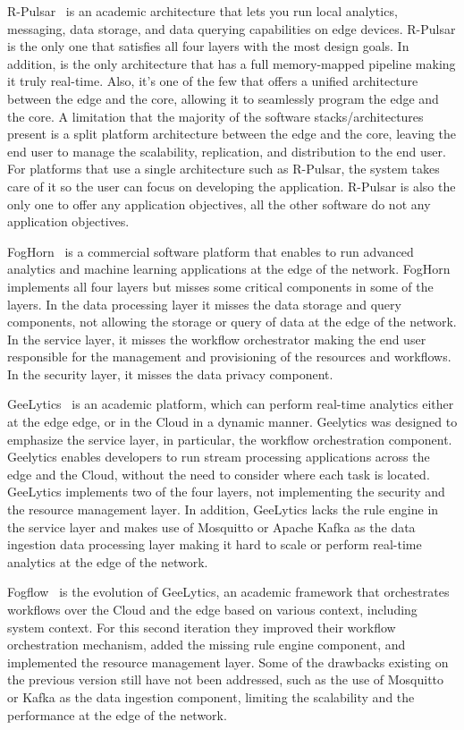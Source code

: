 R-Pulsar~\cite{8014357,8109157} is an academic architecture that lets you run local analytics, messaging, data storage, and data querying capabilities on edge devices. R-Pulsar is the only one that satisfies all four layers with the most design goals. In addition, is the only architecture that has a full memory-mapped pipeline making it truly real-time. Also, it's one of the few that offers a unified architecture between the edge and the core, allowing it to seamlessly program the edge and the core. A limitation that the majority of the software stacks/architectures present is a split platform architecture between the edge and the core, leaving the end user to manage the scalability, replication, and distribution to the end user. For platforms that use a single architecture such as R-Pulsar, the system takes care of it so the user can focus on developing the application. R-Pulsar is also the only one to offer any application objectives, all the other software do not any application objectives.

FogHorn~\cite{fogHorn} is a commercial software platform that enables to run advanced analytics and machine learning applications at the edge of the network. FogHorn implements all four layers but misses some critical components in some of the layers. In the data processing layer it misses the data storage and query components, not allowing the storage or query of data at the edge of the network. In the service layer, it misses the workflow orchestrator making the end user responsible for the management and provisioning of the resources and workflows. In the security layer, it misses the data privacy component.

GeeLytics~\cite{7389116} is an academic platform, which can perform real-time analytics either at the edge edge, or in the Cloud in a dynamic manner. Geelytics was designed to emphasize the service layer, in particular, the workflow orchestration component. Geelytics enables developers to run stream processing applications across the edge and the Cloud, without the need to consider where each task is located. GeeLytics implements two of the four layers, not implementing the security and the resource management layer. In addition, GeeLytics lacks the rule engine in the service layer and makes use of Mosquitto or Apache Kafka as the data ingestion data processing layer making it hard to scale or perform real-time analytics at the edge of the network.

Fogflow~\cite{8022859} is the evolution of GeeLytics, an academic framework that orchestrates workflows over the Cloud and the edge based on various context, including system context. For this second iteration they improved their workflow orchestration mechanism, added the missing rule engine component, and implemented the resource management layer. Some of the drawbacks existing on the previous version still have not been addressed, such as the use of Mosquitto or Kafka as the data ingestion component, limiting the scalability and the performance at the edge of the network.


